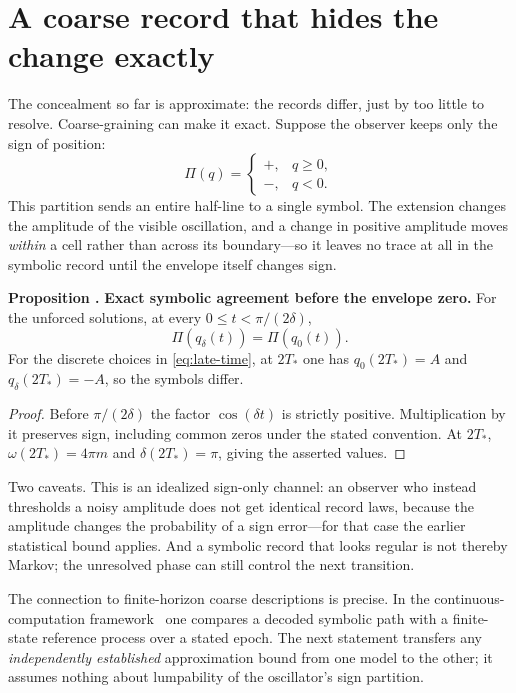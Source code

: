 \documentclass[10pt]{article}
\newcounter{claim}
\newcommand{\claim}[2]{\refstepcounter{claim}\label{#1}\textbf{#2 \theclaim.}}
\begin{document}
\section*{A coarse record that hides the change exactly}
The concealment so far is approximate: the records differ, just by too little to
resolve. Coarse-graining can make it exact. Suppose the observer keeps only the
sign of position:
\[
\Pi(q)=\begin{cases}+,&q\geq0,\\-,&q<0.\end{cases}
\]
This partition sends an entire half-line to a single symbol. The extension
changes the amplitude of the visible oscillation, and a change in positive
amplitude moves \emph{within} a cell rather than across its boundary---so it
leaves no trace at all in the symbolic record until the envelope itself changes
sign.

\begin{resultbox}
\claim{prop:sign}{Proposition} \textbf{Exact symbolic agreement before the envelope zero.}
For the unforced solutions, at every $0\leq t<\pi/(2\delta)$,
\begin{equation}
\Pi(q_\delta(t))=\Pi(q_0(t)).
\label{eq:sign}
\end{equation}
For the discrete choices in \eqref{eq:late-time}, at $2T_*$ one has
$q_0(2T_*)=A$ and $q_\delta(2T_*)=-A$, so the symbols differ.
\end{resultbox}
\begin{proof}
Before $\pi/(2\delta)$ the factor $\cos(\delta t)$ is strictly positive.
Multiplication by it preserves sign, including common zeros under the stated
convention. At $2T_*$, $\omega(2T_*)=4\pi m$ and
$\delta(2T_*)=\pi$, giving the asserted values.
\end{proof}

Two caveats. This is an idealized sign-only channel: an observer who instead
thresholds a noisy amplitude does not get identical record laws, because the
amplitude changes the probability of a sign error---for that case the earlier
statistical bound applies. And a symbolic record that looks regular is not
thereby Markov; the unresolved phase can still control the next transition.

The connection to finite-horizon coarse descriptions is precise. In the
continuous-computation framework~\cite{landers,geometry} one compares a decoded
symbolic path with a finite-state reference process over a stated epoch. The
next statement transfers any \emph{independently established} approximation
bound from one model to the other; it assumes nothing about lumpability of the
oscillator's sign partition.
\end{document}
